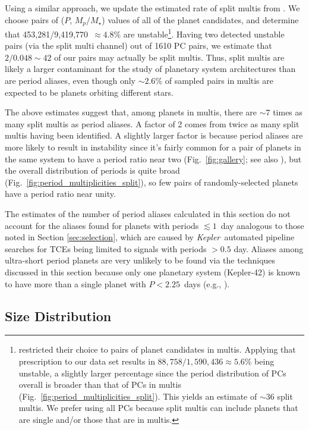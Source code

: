\documentclass{aastex62}
\newcommand{\ik}{{\it Kepler~}}
\begin{document}
Using a similar approach, we update the estimated rate of split multis from \cite{Fabrycky:2014}. 
We choose pairs of ($P$, $M_p/M_\star$) values of {all of the planet candidates, and determine that 453,281/9,419,770~$\approx 4.8$\% are unstable\footnote{{\cite{Fabrycky:2014} restricted their choice to pairs of planet candidates in multis. Applying that prescription to our data set results in $88,758/1,590,436 \approx 5.6$\% being unstable, a slightly larger percentage since the period distribution of PCs overall is broader than that of PCs in multis (Fig.~\ref{fig:period_multiplicities_split}). This yields an estimate of $\sim 36$ split multis. We prefer using all PCs because split multis can include planets that are single and/or those that are in multis.}}. Having two detected unstable pairs (via the split multi channel) out of 1610 PC pairs, we estimate that $2/0.048\sim 42$ of our pairs may actually be split multis. Thus, split multis are likely a larger contaminant for the study of planetary system architectures than are period aliases, even though only $\sim2.6$\% of sampled pairs in multis are expected to be planets orbiting different stars.} 

The above estimates suggest that, among planets in multis, there are $\sim 7$ times as many split multis as period aliases. A factor of 2 comes from twice as many split multis having been identified.  A slightly larger factor is because period aliases are more likely to result in instability since it's fairly common for a pair of planets in the same system to have a period ratio near two (Fig.~\ref{fig:gallery}; see also \citealt{Fabrycky:2014}), but the overall distribution of periods is quite broad (Fig.~\ref{fig:period_multiplicities_split}), so few pairs of randomly-selected planets have a period ratio near unity.

The estimates of the number of period aliases calculated in this section do not account for the aliases found for planets with periods $\lesssim 1 $~day analogous to those noted in Section \ref{sec:selection}, which are caused by \ik automated pipeline searches for TCEs being limited to signals with periods $> 0.5$ day. Aliases among ultra-short period planets are very unlikely to be found via the techniques discussed in this section because only one planetary system (Kepler-42) is known to have more than a single planet with $P < 2.25$~days (e.g., \citealt{Steffen:2013b,Lissauer:2023}).

\subsection{Size Distribution} \label{sec:sizes}
\end{document}
